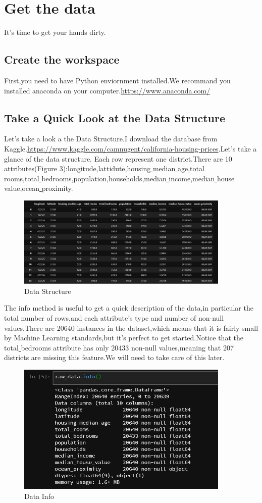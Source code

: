 \documentclass[UTF8]{ctexart}
\begin{document}
\section{Get the data}
It's time to get your hands dirty.
\subsection{Create the workspace}
First,you need to have Python enviornment installed.We recommand you installed anaconda on your computer.\url{https://www.anaconda.com/}
\subsection{Take a Quick Look at the Data Structure}
Let's take a look a the Data Structure.I download the database from Kaggle.\url{https://www.kaggle.com/camnugent/california-housing-prices}.Let's take a glance of the data structure.
Each row represent one district.There are 10 attributes(Figure 3):longitude,lattidute,housing\underline{ }median\underline{ }age,total\underline{ }\\rooms,total\underline{ }bedrooms,population,households,median\underline{ }income,median\underline{ }house\underline{ }value,ocean\underline{ }proximity.

\begin{figure}[H]
\centering
\includegraphics[width = 4in]{DataStructure.JPG}
\caption{Data Structure}
\end{figure}

The info method is useful to get a quick description of the data,in particular the total number of rows,and each attribute's type and number of non-null values.There are 20640 instances in the dataset,which means that it is fairly small by Machine Learning standards,but it's perfect to get started.Notice that the total\underline{ }bedrooms attribute has only 20433 non-null values,meaning that 207 districts are missing this feature.We will need to take care of this later.

\begin{figure}[H]
\centering
\includegraphics[width = 4in]{datainfo.JPG}
\caption{Data Info}
\end{figure}
\end{document}

